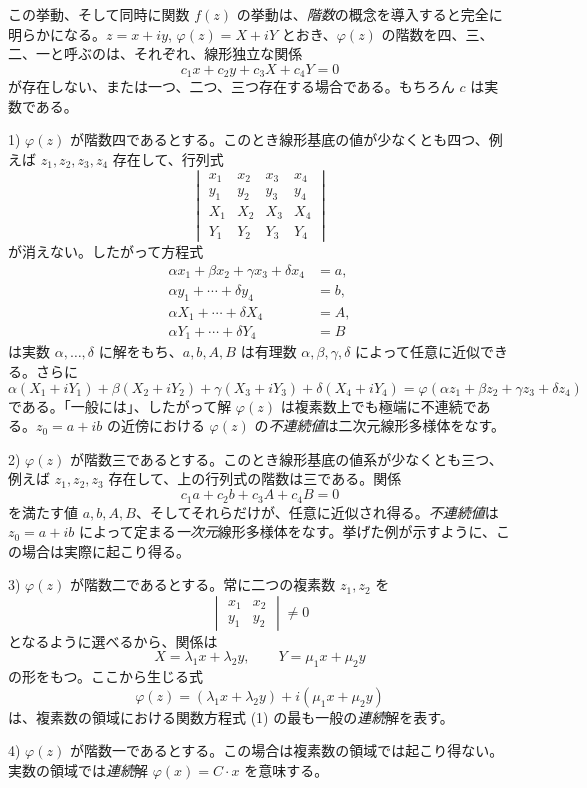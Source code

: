 \documentclass[11pt]{article}
\begin{document}
この挙動、そして同時に関数 $f(z)$ の挙動は、\emph{階数}の概念を導入すると完全に明らかになる。$z=x+iy$, $\varphi(z)=X+iY$ とおき、$\varphi(z)$ の階数を四、三、二、一と呼ぶのは、それぞれ、線形独立な関係
\[
c_1x+c_2y+c_3X+c_4Y=0
\]
が存在しない、または一つ、二つ、三つ存在する場合である。もちろん $c$ は実数である。

1) $\varphi(z)$ が階数四であるとする。このとき線形基底の値が少なくとも四つ、例えば $z_1,z_2,z_3,z_4$ 存在して、行列式
\[
\begin{vmatrix}
x_1&x_2&x_3&x_4\\
y_1&y_2&y_3&y_4\\
X_1&X_2&X_3&X_4\\
Y_1&Y_2&Y_3&Y_4
\end{vmatrix}
\]
が消えない。したがって方程式
\[
\begin{aligned}
\alpha x_1+\beta x_2+\gamma x_3+\delta x_4&=a,\\
\alpha y_1+\cdots+\delta y_4&=b,\\
\alpha X_1+\cdots+\delta X_4&=A,\\
\alpha Y_1+\cdots+\delta Y_4&=B
\end{aligned}
\]
は実数 $\alpha,\ldots,\delta$ に解をもち、$a,b,A,B$ は有理数 $\alpha,\beta,\gamma,\delta$ によって任意に近似できる。さらに
\[
\alpha(X_1+iY_1)+\beta(X_2+iY_2)+\gamma(X_3+iY_3)+\delta(X_4+iY_4)
=\varphi(\alpha z_1+\beta z_2+\gamma z_3+\delta z_4)
\]
である。「一般には」、したがって解 $\varphi(z)$ は複素数上でも極端に不連続である。$z_0=a+ib$ の近傍における $\varphi(z)$ の\emph{不連続値}は二次元線形多様体をなす。

2) $\varphi(z)$ が階数三であるとする。このとき線形基底の値系が少なくとも三つ、例えば $z_1,z_2,z_3$ 存在して、上の行列式の階数は三である。関係
\[
c_1a+c_2b+c_3A+c_4B=0
\]
を満たす値 $a,b,A,B$、そしてそれらだけが、任意に近似され得る。\emph{不連続値}は $z_0=a+ib$ によって定まる\emph{一次元}線形多様体をなす。挙げた例が示すように、この場合は実際に起こり得る。

3) $\varphi(z)$ が階数二であるとする。常に二つの複素数 $z_1,z_2$ を
\[
\begin{vmatrix}x_1&x_2\\ y_1&y_2\end{vmatrix}\ne0
\]
となるように選べるから、関係は
\[
X=\lambda_1x+\lambda_2y,
\qquad
Y=\mu_1x+\mu_2y
\]
の形をもつ。ここから生じる式
\[
\varphi(z)=(\lambda_1x+\lambda_2y)+i(\mu_1x+\mu_2y)
\]
は、複素数の領域における関数方程式 (1) の最も一般の\emph{連続}解を表す。

4) $\varphi(z)$ が階数一であるとする。この場合は複素数の領域では起こり得ない。実数の領域では\emph{連続}解 $\varphi(x)=C\cdot x$ を意味する。
\end{document}
